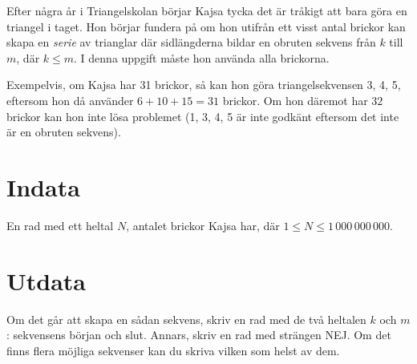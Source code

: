 
Efter några år i Triangelskolan börjar Kajsa tycka det är tråkigt att bara göra en triangel i taget. Hon börjar fundera på om hon utifrån ett visst antal brickor kan skapa en {\em serie} av trianglar där sidlängderna bildar en obruten sekvens från $k$ till $m$, där $k\le m$. I denna uppgift måste hon använda alla brickorna.

Exempelvis, om Kajsa har 31 brickor, så kan hon göra triangelsekvensen 3, 4, 5, eftersom hon då använder $6+10+15=31$ brickor. Om hon däremot har $32$ brickor kan hon inte lösa problemet (1, 3, 4, 5 är inte godkänt eftersom det inte är en obruten sekvens).

\section*{Indata}
En rad med ett heltal $N$, antalet brickor Kajsa har, där $1\le N \le 1\,000\,000\,000$.
\section*{Utdata}
Om det går att skapa en sådan sekvens, skriv en rad med de två heltalen $k$ och $m$: sekvensens början och slut. Annars, skriv en rad med strängen NEJ. Om det finns flera möjliga sekvenser kan du skriva vilken som helst av dem.

